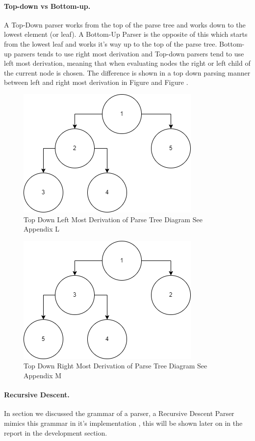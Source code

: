 \paragraph{Top-down vs Bottom-up. } A Top-Down parser works from the top of the parse tree and works down to the lowest element (or leaf). A Bottom-Up Parser is the opposite of this 
which starts from the lowest leaf and works it's way up to the top of the parse tree. Bottom-up parsers tends to use right most derivation and Top-down parsers tend to use left most derivation, meaning that when evaluating nodes the right or left child of the current node is chosen. 
The difference is shown in a top down parsing manner between left and right most derivation in Figure  and Figure  \cite{topDownBottomUp}. 
\begin{figure}[h]
    \includegraphics[width=.4\textwidth]{appendix/L/Leftmostderivation.png}
    \caption{Top Down Left Most Derivation of Parse Tree Diagram See Appendix L}
    \label{fig:leftdir}
\end{figure}
\begin{figure}[h]
    \includegraphics[width=.4\textwidth]{appendix/M/RightMostDerivation.png}
    \caption{Top Down Right Most Derivation of Parse Tree Diagram See Appendix M}
    \label{fig:rightdir}
\end{figure}

\paragraph{Recursive Descent.}
In section  we discussed the grammar of a parser, a Recursive Descent Parser mimics this grammar in it's implementation , 
this will be shown later on in the report in the development section.
